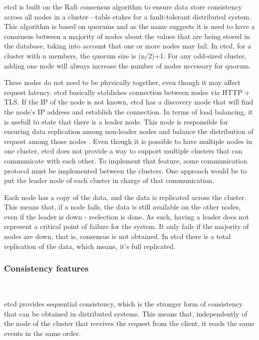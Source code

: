 \documentclass[screen,review]{acmart}
\begin{document}
etcd is built on the Raft consensus algorithm \cite{raft} to ensure data store consistency across all nodes in a cluster—table stakes for a fault-tolerant distributed system. This algorithm is based on quorums and as the name suggests it is used to have a consensus between a majority of nodes about the values that are being stored in the database, taking into account that one or more nodes may fail. In etcd, for a cluster with n members, the quorum size is (n/2)+1. For any odd-sized cluster, adding one node will always increase the number of nodes necessary for quorum.

These nodes do not need to be physically together, even though it may affect request latency. etcd basically stablishes connection between nodes via HTTP + TLS. If the IP of the node is not known, etcd has a discovery mode that will find the node's IP address and establish the connection.
In terms of load balancing, it is usefull to state that there is a leader node. This node is responsible for ensuring data replication among non-leader nodes and balance the distribution of request among those nodes \cite{etcd_faq}.
Even though it is possible to have multiple nodes in one cluster, etcd does not provide a way to support multiple clusters that can communicate with each other. To implement that feature, some communication protocol must be implemented between the clusters. One approach would be to put the leader node of each cluster in charge of that communication.

Each node has a copy of the data, and the data is replicated across the cluster. This means that, if a node fails, the data is still available on the other nodes, even if the leader is down - reelection is done. As such, having a leader does not represent a critical point of failure for the system. It only fails if the majority of nodes are down, that is, consensus is not obtained.
In etcd there is a total replication of the data, which means, it's full replicated. \\

\subsubsection{Consistency features}~\

etcd provides sequential consistency, which is the stronger form of consistency that can be obtained in distributed systems. This means that, independently of the node of the cluster that receives the request from the client, it reads the same events in the same order.
\end{document}
